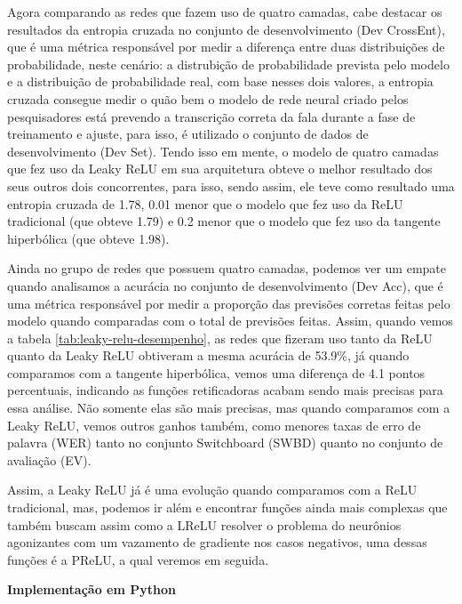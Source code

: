 \begin{table}[ht]
\begin{threeparttable}
    \end{threeparttable}
\end{table}

Agora comparando as redes que fazem uso de quatro camadas, cabe destacar os resultados da entropia cruzada no conjunto de desenvolvimento (Dev CrossEnt), que é uma métrica responsável por medir a diferença entre duas distribuições de probabilidade, neste cenário: a distrubição de probabilidade prevista pelo modelo e a distribuição de probabilidade real, com base nesses dois valores, a entropia cruzada consegue medir o quão bem o modelo de rede neural criado pelos pesquisadores está prevendo a transcrição correta da fala durante a fase de treinamento e ajuste, para isso, é utilizado o conjunto de dados de desenvolvimento (Dev Set). Tendo isso em mente, o modelo de quatro camadas que fez uso da Leaky ReLU em sua arquitetura obteve o melhor resultado dos seus outros dois concorrentes, para isso, sendo assim, ele teve como resultado uma entropia cruzada de 1.78, 0.01 menor que o modelo que fez uso da ReLU tradicional (que obteve 1.79) e 0.2 menor que o modelo que fez uso da tangente hiperbólica (que obteve 1.98).

Ainda no grupo de redes que possuem quatro camadas, podemos ver um empate quando analisamos a acurácia no conjunto de desenvolvimento (Dev Acc), que é uma métrica responsável por medir a proporção das previsões corretas feitas pelo modelo quando comparadas com o total de previsões feitas. Assim, quando vemos a tabela \ref{tab:leaky-relu-desempenho}, as redes que fizeram uso tanto da ReLU quanto da Leaky ReLU obtiveram a mesma acurácia de 53.9\%, já quando comparamos com a tangente hiperbólica, vemos uma diferença de 4.1 pontos percentuais, indicando as funções retificadoras acabam sendo mais precisas para essa análise. Não somente elas são mais precisas, mas quando comparamos com a Leaky ReLU, vemos outros ganhos também, como menores taxas de erro de palavra (WER) tanto no conjunto Switchboard (SWBD) quanto no conjunto de avaliação (EV).

Assim, a Leaky ReLU já é uma evolução quando comparamos com a ReLU tradicional, mas, podemos ir além e encontrar funções ainda mais complexas que também buscam assim como a LReLU resolver o problema do neurônios agonizantes com um vazamento de gradiente nos casos negativos, uma dessas funções é a PReLU, a qual veremos em seguida.

\textbf{Implementação em Python}

